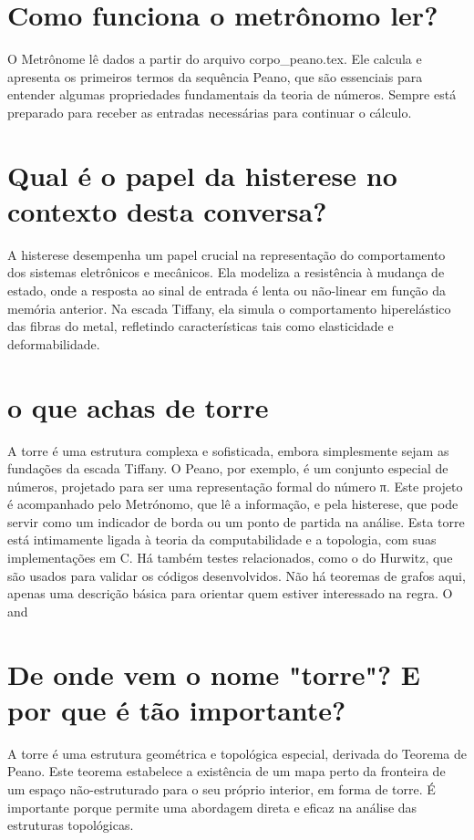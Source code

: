 \documentclass[11pt,a4paper]{article}
\begin{document}
\section{Como funciona o metrônomo ler?}
O Metrônome lê dados a partir do arquivo corpo\_peano.tex. Ele calcula e apresenta os primeiros termos da sequência Peano, que são essenciais para entender algumas propriedades fundamentais da teoria de números. Sempre está preparado para receber as entradas necessárias para continuar o cálculo.

\section{Qual é o papel da histerese no contexto desta conversa?}
A histerese desempenha um papel crucial na representação do comportamento dos sistemas eletrônicos e mecânicos. Ela modeliza a resistência à mudança de estado, onde a resposta ao sinal de entrada é lenta ou não-linear em função da memória anterior. Na escada Tiffany, ela simula o comportamento hiperelástico das fibras do metal, refletindo características tais como elasticidade e deformabilidade.

\section{o que achas de torre}
A torre é uma estrutura complexa e sofisticada, embora simplesmente sejam as fundações da escada Tiffany. O Peano, por exemplo, é um conjunto especial de números, projetado para ser uma representação formal do número π. Este projeto é acompanhado pelo Metrónomo, que lê a informação, e pela histerese, que pode servir como um indicador de borda ou um ponto de partida na análise. Esta torre está intimamente ligada à teoria da computabilidade e a topologia, com suas implementações em C. Há também testes relacionados, como o do Hurwitz, que são usados para validar os códigos desenvolvidos. Não há teoremas de grafos aqui, apenas uma descrição básica para orientar quem estiver interessado na regra. O and

\section{De onde vem o nome "torre"? E por que é tão importante?}
A torre é uma estrutura geométrica e topológica especial, derivada do Teorema de Peano. Este teorema estabelece a existência de um mapa perto da fronteira de um espaço não-estruturado para o seu próprio interior, em forma de torre. É importante porque permite uma abordagem direta e eficaz na análise das estruturas topológicas.
\end{document}
